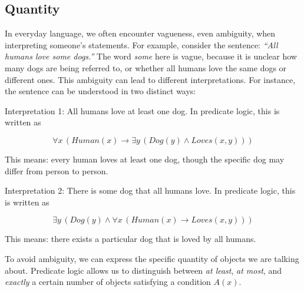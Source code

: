 \documentclass[12pt,a4paper,openany]{article}
\begin{document}
\subsection{Quantity}
\label{quantity}

In everyday language, we often encounter vagueness, even ambiguity, when
interpreting someone's statements. For example, consider the sentence:
\emph{``All humans love some dogs.''} The word \emph{some} here is
vague, because it is unclear how many dogs are being referred to, or
whether all humans love the same dogs or different ones. This ambiguity
can lead to different interpretations. For instance, the sentence can be
understood in two distinct ways:

Interpretation 1: All humans love at least one dog. In predicate logic, this is written as

\[
\forall x \, (Human(x) \rightarrow \exists y \, (Dog(y) \land Loves(x,y)))
\]

This means: every human loves at least one dog, though the specific dog
may differ from person to person.

Interpretation 2: There is some dog that all humans love. In predicate logic, this is
written as

\[
\exists y \, (Dog(y) \land \forall x \, (Human(x) \rightarrow Loves(x,y)))
\]

This means: there exists a particular dog that is loved by all humans.

To avoid ambiguity, we can express the specific quantity of objects we
are talking about. Predicate logic allows us to distinguish between
\emph{at least}, \emph{at most}, and \emph{exactly} a certain number of
objects satisfying a condition \(A(x)\).
\end{document}
